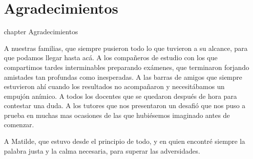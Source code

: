 \chapter*{Agradecimientos}
 {chapter} {Agradecimientos}%

A nuestras familias, que siempre pusieron todo lo que tuvieron a su alcance, para que podamos llegar hasta acá. A los compañeros de estudio con los que compartimos tardes interminables preparando exámenes, que terminaron forjando amistades tan profundas como inesperadas. A las barras de amigos que siempre estuvieron ahí cuando los resultados no acompañaron y necesitábamos un empujón anímico. A todos los docentes que se quedaron después de hora para contestar una duda. A los tutores que nos presentaron un desafió que nos puso a prueba en muchas mas ocasiones de las que hubiésemos imaginado antes de comenzar.

A Matilde, que estuvo desde el principio de todo, y en quien encontré siempre la palabra justa y la calma necesaria, para superar las adversidades.

